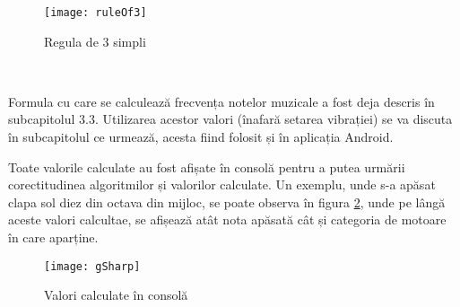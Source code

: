 \documentclass[../IoMusT.tex]{subfiles}
\begin{document}
\begin{figure}[h]
\centering
\texttt{[image: ruleOf3]}
\caption{Regula de 3 simpli}
\label{fig:ruleOf3}
\end{figure}  
\\
\par Formula cu care se calculează frecvența notelor muzicale a fost deja descris în subcapitolul 3.3. Utilizarea acestor valori (înafară setarea vibrației) se va discuta în subcapitolul ce urmează, acesta fiind folosit și în aplicația Android.
\\
\par Toate valorile calculate au fost afișate în consolă pentru a putea urmării corectitudinea algoritmilor și valorilor calculate. Un exemplu, unde s-a apăsat clapa sol diez din octava din mijloc, se poate observa în figura \ref{fig:gSharp}, unde pe lângă aceste valori calcultae, se afișează atât nota apăsată cât și categoria de motoare în care aparține. 
\begin{figure}[h]
\centering
\texttt{[image: gSharp]}
\caption{Valori calculate în consolă}
\label{fig:gSharp}
\end{figure}  
\end{document}
